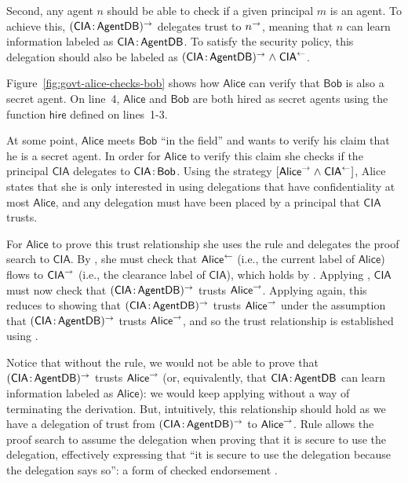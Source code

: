 Second, any agent $n$ should be able to check if a given principal $m$ is an agent. To achieve this, $(\mathsf{CIA} \colon \!\mathsf{AgentDB})^{\rightarrow}$ delegates trust to $n^{\rightarrow}$, meaning that $n$ can learn information labeled as $\mathsf{CIA} \colon \!\mathsf{AgentDB}$. To satisfy the security policy, this delegation should also be labeled as $(\mathsf{CIA} \colon \!\mathsf{AgentDB})^{\rightarrow} \mathrel{\land} \mathsf{CIA}^{\leftarrow}$.

Figure~\ref{fig:govt-alice-checks-bob} shows how $\mathsf{Alice}$ can verify that $\mathsf{Bob}$ is also a secret agent. On line~4, $\mathsf{Alice}$ and $\mathsf{Bob}$ are both hired as secret agents using the function $\mathsf{hire}$ defined on lines~1-3. 

At some point, $\mathsf{Alice}$ meets $\mathsf{Bob}$ ``in the field'' and wants to verify his claim that he is a secret agent. In order for $\mathsf{Alice}$ to verify this claim she checks if the principal $\mathsf{CIA}$ delegates to $\mathsf{CIA} \colon \!\mathsf{Bob}$. Using the strategy $[\mathsf{Alice}^{\rightarrow} \mathrel{\land} \mathsf{CIA}^{\leftarrow}]$, Alice states that she is only interested in using delegations that have confidentiality at most $\mathsf{Alice}$, and any delegation must have been placed by a principal that $\mathsf{CIA}$ trusts.

For $\mathsf{Alice}$ to prove this trust relationship she uses the  rule and delegates the proof search to $\mathsf{CIA}$. By , she must check that $\mathsf{Alice}^{\leftarrow}$ (i.e., the current label of $\mathsf{Alice}$) flows to $\mathsf{CIA}^{\rightarrow}$ (i.e., the clearance label of $\mathsf{CIA}$), which holds by . Applying , $\mathsf{CIA}$ must now check that $(\mathsf{CIA} \colon \!\mathsf{AgentDB})^{\rightarrow}$ trusts $\mathsf{Alice}^{\rightarrow}$. Applying  again, this reduces to showing that $(\mathsf{CIA} \colon \!\mathsf{AgentDB})^{\rightarrow}$ trusts $\mathsf{Alice}^{\rightarrow}$ under the assumption that $(\mathsf{CIA} \colon \!\mathsf{AgentDB})^{\rightarrow}$ trusts $\mathsf{Alice}^{\rightarrow}$, and so the trust relationship is established using .

Notice that without the  rule, we would not be able to prove that $(\mathsf{CIA} \colon \!\mathsf{AgentDB})^{\rightarrow}$ trusts $\mathsf{Alice}^{\rightarrow}$ (or, equivalently, that $\mathsf{CIA} \colon \!\mathsf{AgentDB}$ can learn information labeled as $\mathsf{Alice}$): we would keep applying  without a way of terminating the derivation. But, intuitively, this relationship should hold as we have a delegation of trust from $(\mathsf{CIA} \colon \!\mathsf{AgentDB})^{\rightarrow}$ to $\mathsf{Alice}^{\rightarrow}$.
Rule  allows the proof search to assume the delegation when proving that it is secure to use the delegation, effectively expressing that ``it is secure to use the delegation because the delegation says so'': a form of checked endorsement \cite{Chong:2007:SWA:1294261.1294265, DBLP:journals/corr/abs-1107-5594}.


